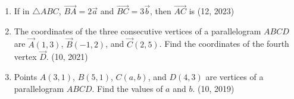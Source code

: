 \begin{enumerate}[label=\thesubsection.\arabic*, ref=\thesubsection.\theenumi]
    \item If in $\triangle ABC$, $\overrightarrow{BA} = 2\overrightarrow{a}$ and $\overrightarrow{BC} = 3\overrightarrow{b}$, then $\overrightarrow{AC}$ is
    \hfill (12, 2023)
	\item The coordinates of the three consecutive vertices of a parallelogram $ABCD$ are $\vec{A}(1, 3)$, $\vec{B}(-1, 2)$, and $\vec{C}(2, 5)$. Find the coordinates of the fourth vertex $\vec{D}$. \hfill (10, 2021)
\item Points $A(3, 1)$, $B(5, 1)$, $C(a, b)$, and $D(4, 3)$ are vertices of a parallelogram $ABCD$. Find the values of $a$ and $b$. \hfill (10, 2019)
	
\end{enumerate}
